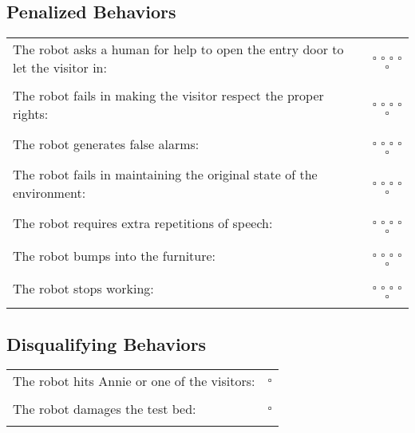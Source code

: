 \subsection*{Penalized Behaviors}
\begin{tabular}{ l c}
The robot asks a human for help to open the entry door to let the visitor in: & $\square$ $\square$ $\square$ $\square$ $\square$ \\ \\
The robot fails in making the visitor respect the proper rights: & $\square$ $\square$ $\square$ $\square$ $\square$ \\ \\
The robot generates false alarms: & $\square$ $\square$ $\square$ $\square$ $\square$ \\ \\
The robot fails in maintaining the original state of the environment: & $\square$ $\square$ $\square$ $\square$ $\square$ \\ \\
The robot requires extra repetitions of speech: & $\square$ $\square$ $\square$ $\square$ $\square$ \\ \\
The robot bumps into the furniture: & $\square$ $\square$ $\square$ $\square$ $\square$ \\ \\
The robot stops working: & $\square$ $\square$ $\square$ $\square$ $\square$ \\ \\
\end{tabular}

\subsection*{Disqualifying Behaviors}
\begin{tabular}{ l c}
The robot hits Annie or one of the visitors: & $\square$ \\ \\
The robot damages the test bed: & $\square$ \\ \\
\end{tabular}

